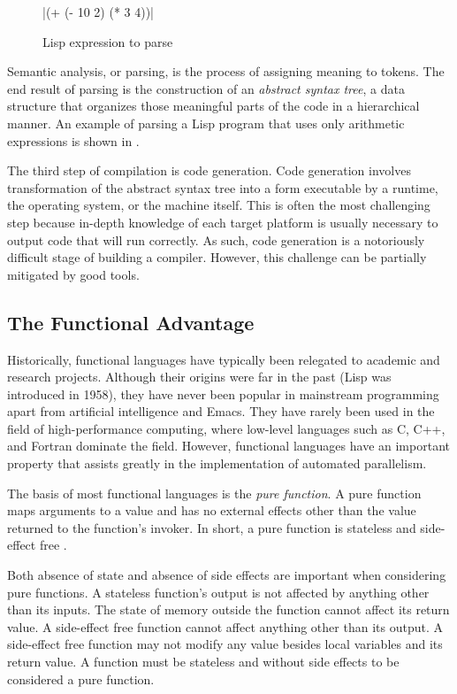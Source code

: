 \documentclass[
abstracton,
fontsize=12pt,
]{scrartcl}
\begin{document}
\begin{figure}
  \centering
  \scheme|(+ (- 10 2) (* 3 4))|
  \caption{Lisp expression to parse}\label{fig:lisp-parsing}
\end{figure}

Semantic analysis, or parsing, is the process of assigning meaning to tokens. The end result of parsing is the construction of an \textit{abstract syntax tree}, a data structure that organizes those meaningful parts of the code in a hierarchical manner. An example of parsing a Lisp program that uses only arithmetic expressions is shown in .

The third step of compilation is code generation. Code generation involves transformation of the abstract syntax tree into a form executable by a runtime, the operating system, or the machine itself. This is often the most challenging step because in-depth knowledge of each target platform is usually necessary to output code that will run correctly. As such, code generation is a notoriously difficult stage of building a compiler. However, this challenge can be partially mitigated by good tools.

\subsection{The Functional Advantage}

Historically, functional languages have typically been relegated to academic and research projects. Although their origins were far in the past (Lisp was introduced in 1958), they have never been popular in mainstream programming apart from artificial intelligence and Emacs. They have rarely been used in the field of high-performance computing, where low-level languages such as C, C++, and Fortran dominate the field. However, functional languages have an important property that assists greatly in the implementation of automated parallelism.

The basis of most functional languages is the \emph{pure function}. A pure function maps arguments to a value and has no external effects other than the value returned to the function's invoker. In short, a pure function is stateless and side-effect free \autocite{10.1109/MCSE.2012.69}.

Both absence of state and absence of side effects are important when considering pure functions. A stateless function's output is not affected by anything other than its inputs. The state of memory outside the function cannot affect its return value. A side-effect free function cannot affect anything other than its output. A side-effect free function may not modify any value besides local variables and its return value. A function must be stateless and without side effects to be considered a pure function.
\end{document}
